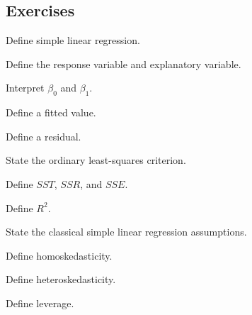 \subsection{Exercises}
\label{subsec:regression-exercises}

\begin{exercise}[1]
Define simple linear regression.
\end{exercise}

\begin{exercise}[1]
Define the response variable and explanatory variable.
\end{exercise}

\begin{exercise}[1]
Interpret \(\beta_0\) and \(\beta_1\).
\end{exercise}

\begin{exercise}[1]
Define a fitted value.
\end{exercise}

\begin{exercise}[1]
Define a residual.
\end{exercise}

\begin{exercise}[1]
State the ordinary least-squares criterion.
\end{exercise}

\begin{exercise}[1]
Define \(SST\), \(SSR\), and \(SSE\).
\end{exercise}

\begin{exercise}[1]
Define \(R^2\).
\end{exercise}

\begin{exercise}[1]
State the classical simple linear regression assumptions.
\end{exercise}

\begin{exercise}[1]
Define homoskedasticity.
\end{exercise}

\begin{exercise}[1]
Define heteroskedasticity.
\end{exercise}

\begin{exercise}[1]
Define leverage.
\end{exercise}

